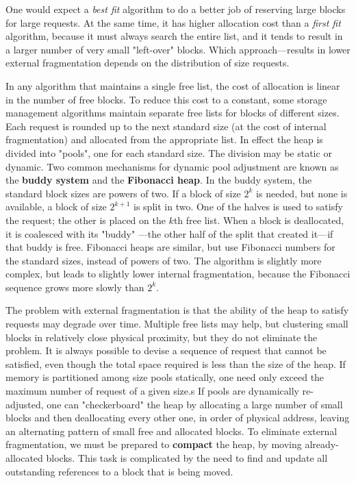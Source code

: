 \vskip 6pt
One would expect  a {\it best fit} algorithm to do a better job of reserving large blocks for large requests. At the same time, it has higher allocation cost than a {\it first fit} algorithm, because it must always search the entire list, and it tends to result in a larger number of very small "left-over" blocks. Which approach---results in lower external fragmentation depends on the distribution of size requests.

\vskip 6pt
In any algorithm that maintains a single free list, the cost of allocation is linear in the number of free blocks. To reduce this cost to a constant, some storage management algorithms maintain separate free lists for blocks of different sizes. Each request is rounded up to the next standard size (at the cost of internal fragmentation) and allocated from the appropriate list. In effect the heap is divided into "pools", one for each standard size. The division may be static or dynamic. Two common mechanisms for dynamic pool adjustment are known as the {\bf buddy system} and the {\bf Fibonacci heap}. In the buddy system, the standard block sizes are powers of two. If a block of size $2^k$ is needed, but none is available, a block of size $2^{k+1}$ is split in two. One of the halves is used to satisfy the request; the other is placed on the $k$th free list. When a block is deallocated, it is coalesced with its "buddy" ---the other half of the split that created it---if that buddy is free. Fibonacci heaps are similar, but use Fibonacci numbers for the standard sizes, instead of powers of two. The algorithm is slightly more complex, but leads to slightly lower internal fragmentation, because the Fibonacci sequence grows more slowly than $2^k$.

\vskip 6pt
The problem with external fragmentation is that the ability of the heap to satisfy requests may degrade over time. Multiple free lists may help, but clustering small blocks in relatively close physical proximity, but they do not eliminate the problem. It is always possible to devise a sequence of request that cannot be satisfied, even though the total space required is less than the size of the heap. If memory is partitioned among size pools statically, one need only exceed the maximum number of request of a given size.s If pools are dynamically re-adjusted, one can "checkerboard" the heap by allocating a large number of small blocks and then deallocating every other one, in order of physical address, leaving an alternating pattern of small free and allocated blocks. To eliminate external fragmentation, we must be prepared to {\bf compact} the heap, by moving already-allocated blocks. This task is complicated by the need to find and update all outstanding references to a block that is being moved.

\vfill\eject
\bye
